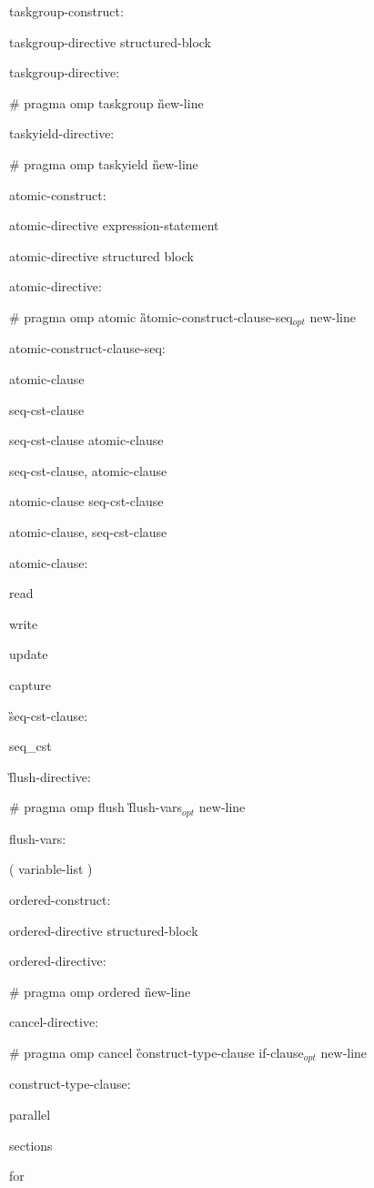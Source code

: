 {taskgroup-construct:

\I taskgroup-directive structured-block

taskgroup-directive:

\C\I \# pragma omp taskgroup \G new-line

taskyield-directive:

\C\I \# pragma omp taskyield \G new-line

atomic-construct:

\I atomic-directive expression-statement

\I atomic-directive structured block

atomic-directive:

\C\I \# pragma omp atomic \G atomic-construct-clause-seq$_{opt}$ new-line

atomic-construct-clause-seq:

\I atomic-clause

\I seq-cst-clause

\I seq-cst-clause atomic-clause

\I seq-cst-clause, atomic-clause

\I atomic-clause seq-cst-clause 

\I atomic-clause, seq-cst-clause 

atomic-clause:

\C\I read

\I write

\I update

\I capture

\G seq-cst-clause:

\C\I seq\_cst

\G flush-directive:

\C\I \# pragma omp flush \G flush-vars$_{opt}$ new-line

flush-vars:

\I ( variable-list )

ordered-construct:

\I ordered-directive structured-block

ordered-directive:

\C\I \# pragma omp ordered \G new-line

cancel-directive:

\C\I \# pragma omp cancel \G construct-type-clause if-clause$_{opt}$ new-line

construct-type-clause:

\C\I parallel

\I sections

\I for

}
